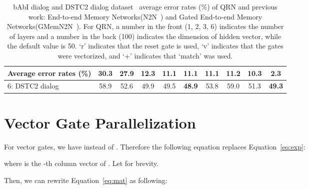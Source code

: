 \documentclass[table]{article}
\begin{document}
\begin{table}[ht]
\begin{center}
{\begin{tabular}{|l||c|c|c|c|c|c||c|c|c|}
 \hline
 Average error rates (\%)                    & 30.3  & 27.9  & 12.3 & {\bf 11.1} & {\bf 11.1} &{\bf 11.1}  & 11.2  & 10.3  &{\bf 2.3} \\
 \hline
 \hline
 6: DSTC2 dialog                        & 58.9 & 52.6 & 49.9 & 49.5  &{\bf 48.9}  & 53.8  & 59.0  & 51.3  &{\bf 49.3}  \\
 \hline 
\end{tabular}
}
\end{center}
\caption{ \small bAbI dialog and DSTC2 dialog dataset~\citep{bordes2016learning} average error rates (\%) of QRN and previous work: End-to-end Memory Networks(N2N~\citep{bordes2016learning}) and Gated End-to-end Memory Networks(GMemN2N~\citep{perez2016gated}). For QRN, a number in the front (1, 2, 3, 6) indicates the number of layers and a number in the back (100) indicates the dimension of hidden vector, while the default value is 50. `r' indicates that the reset gate is used, `v' indicates that the gates were vectorized, and `+' indicates that `match' was used. }
\label{tab:dialog-all}
\end{table}









 
\section{Vector Gate Parallelization}\label{sec:app-b}

For vector gates, we have  instead of . Therefore the following equation replaces Equation~\ref{eq:exp}:




where  is the -th column vector of .
Let  for brevity.
\begin{comment}
and let  as following :

\end{comment}
Then, we can rewrite Equation~\ref{eq:mat} as following:

\begin{comment}


Here, implicit operation is -matrix multiplications. It takes a -by--by- matrix and a -by- matrix and takes matrix multiplication of a -by- matrix and a  vector  in element-wise on  dimension, and has a -by- matrix as output i.e.

\end{comment}
\end{document}
